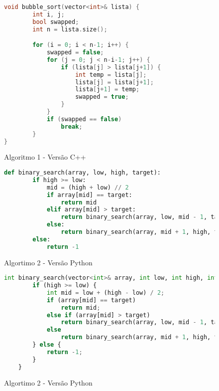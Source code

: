 \documentclass{article}
\begin{document}
\begin{figure} [!ht]
    \begin{lstlisting}[language=c++]
    void bubble_sort(vector<int>& lista) {
        int i, j;
        bool swapped;
        int n = lista.size();

        for (i = 0; i < n-1; i++) {
            swapped = false;
            for (j = 0; j < n-i-1; j++) {
                if (lista[j] > lista[j+1]) {
                    int temp = lista[j];
                    lista[j] = lista[j+1];
                    lista[j+1] = temp;
                    swapped = true;
                }
            }
            if (swapped == false)
                break;
        }
}
    \end{lstlisting}
        \label{fig:alg1_cpp}
        \caption{Algoritmo 1 - Versão C++}
\end{figure}

\begin{figure}

\begin{lstlisting}[language=Python]
    def binary_search(array, low, high, target):
        if high >= low:
            mid = (high + low) // 2
            if array[mid] == target:
                return mid
            elif array[mid] > target:
                return binary_search(array, low, mid - 1, target)
            else:
                return binary_search(array, mid + 1, high, target)
        else:
            return -1
    \end{lstlisting}
    \label{fig:alg2_python}
    \caption{Algortimo 2 - Versão Python}
\end{figure}

\begin{figure}
\begin{lstlisting}[language=Python]
    int binary_search(vector<int>& array, int low, int high, int target) {
        if (high >= low) {
            int mid = low + (high - low) / 2;  
            if (array[mid] == target)
                return mid;
            else if (array[mid] > target)
                return binary_search(array, low, mid - 1, target);
            else
                return binary_search(array, mid + 1, high, target);
        } else {
            return -1;
        }
    }
    \end{lstlisting}
    \label{fig:alg2_cpp}
    \caption{Algortimo 2 - Versão Python}
\end{figure}

%
%
\end{document}
